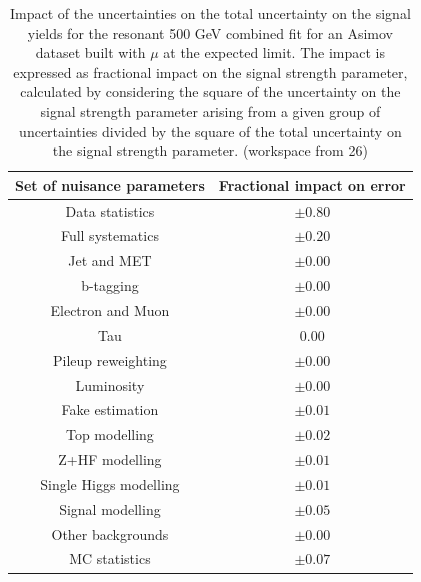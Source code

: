 \begin{table}
\centering
\begin{tabular}{|c|c|}
\hline
Set of nuisance parameters & Fractional impact on error\\
\hline
Data statistics & $\pm 0.80$\\
Full systematics & $\pm 0.20$\\
Jet and MET & $\pm 0.00$ \\
b-tagging & $\pm 0.00$\\
Electron and Muon & $\pm 0.00$\\
Tau & $0.00$\\
Pileup reweighting & $\pm 0.00$\\
Luminosity & $\pm 0.00$\\
Fake estimation & $\pm 0.01$\\
Top modelling & $\pm 0.02$\\ 
Z+HF modelling & $\pm 0.01$\\
Single Higgs modelling & $\pm 0.01$\\
Signal modelling & $\pm 0.05$\\
Other backgrounds & $\pm 0.00$\\
MC statistics & $\pm 0.07$\\
\hline
\end{tabular}
\caption{Impact of the uncertainties on the total uncertainty on the signal yields for the resonant 500 GeV combined fit for an Asimov dataset built with $\mu$ at the expected limit. The impact is expressed as fractional impact on the signal strength parameter,  calculated by considering the square of the uncertainty on the signal strength parameter arising from a given group of uncertainties divided by the square of the total uncertainty on the signal strength parameter.  (workspace from 26)}
\label{sec:fit:tab:CombBreakdown2HDM500Asimov}
\end{table}


